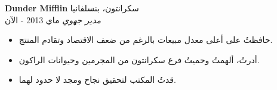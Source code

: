 \foreignlanguage{english}{\textbf{Dunder Mifflin}} \hfill سكرانتون، بنسلفانيا\\
\textit{مدير جهوي} \hfill ماي 2013 - الآن\\
\vspace{-1mm}
\begin{itemize}
	\item حافظتُ على أعلى معدل مبيعات بالرغم من ضعف الاقتصاد وتقادم المنتج.
	\item أدرتُ، ألهمتُ وحميتُ فرع سكرانتون من المجرمين وحيوانات الراكون.
	\item قدتُ المكتب لتحقيق نجاح ومجد لا حدود لهما.
\end{itemize}